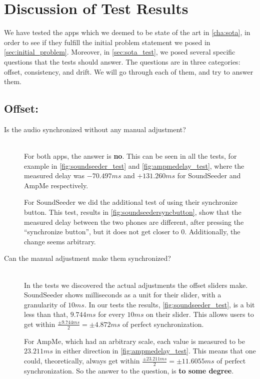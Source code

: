 \section{Discussion of Test Results}

We have tested the apps which we deemed to be state of the art in \cref{cha:sota}, in order to see if they fulfill the initial problem statement we posed in \vref{sec:initial_problem}.
Moreover, in \vref{sec:sota_test}, we posed several specific questions that the tests should answer.
The questions are in three categories: offset, consistency, and drift.
We will go through each of them, and try to answer them.

\subsection*{Offset:}
\begin{description}
    \item[Is the audio synchronized without any manual adjustment?] \hfill \\
    For both apps, the answer is \textbf{no}.
    This can be seen in all the tests, for example in \vref{fig:soundseeder_test} and \vref{fig:ampmedelay_test}, where the measured delay was $-70.497 ms$ and $+131.260 ms$ for SoundSeeder and AmpMe respectively.

    For SoundSeeder we did the additional test of using their synchronize button.
    This test, results in \vref{fig:soundseedersyncbutton}, show that the measured delay between the two phones are different, after pressing the \enquote{synchronize button}, but it does not get closer to $0$.
    Additionally, the change seems arbitrary.
    \item[Can the manual adjustment make them synchronized?] \hfill \\
    In the tests we discovered the actual adjustments the offset sliders make.
    SoundSeeder shows milliseconds as a unit for their slider, with a granularity of $10 ms$.
    In our tests the results, \vref{fig:soundseeder_test}, is a bit less than that, $9.744 ms$ for every $10 ms$ on their slider.
    This allows users to get within $\frac{\pm9.744 ms}{2}=\pm 4.872 ms$ of perfect synchronization.

    For AmpMe, which had an arbitrary scale, each value is measured to be $23.211 ms$ in either direction in \vref{fig:ampmedelay_test}.
    This means that one could, theoretically, always get within $\frac{\pm23.211 ms}{2}=\pm 11.6055 ms$ of perfect synchronization.
    So the answer to the question, is \textbf{to some degree}.
\end{description}

